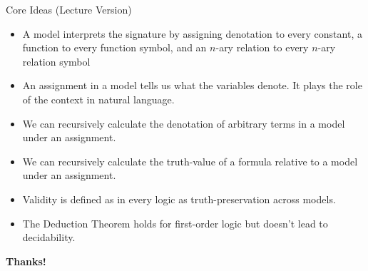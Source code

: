 \begin{frame}{Core Ideas (Lecture Version)}

	\begin{itemize}
	
		\item A model interprets the signature by assigning denotation to every constant, a function to every function symbol, and an $n$-ary relation to every $n$-ary relation symbol
		
		\item An assignment in a model tells us what the variables denote. It plays the role of the context in natural language. 
	
		\item We can recursively calculate the denotation of arbitrary terms in a model under an assignment.
		
		\item We can recursively calculate the truth-value of a formula relative to a model under an assignment.
		
		\item Validity is defined as in every logic as truth-preservation across models.
		
		\item The Deduction Theorem holds for first-order logic but doesn't lead to decidability.
					
	\end{itemize}

\end{frame}


\begin{frame}

	\begin{center}
	{\huge\bf Thanks!}
	\end{center}

\end{frame}

